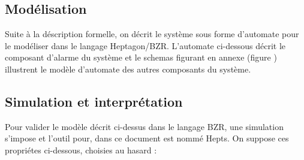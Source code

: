 \documentclass{svjour3}
\begin{document}
\subsection{Modélisation}
Suite à la déscription formelle, on décrit le système sous forme d'automate pour le modéliser dans le langage Heptagon/BZR. L'automate ci-dessous décrit le
composant d'alarme du système et le schemas figurant en annexe (figure ) illustrent le modèle d'automate des autres composants du système.
\subsection{Simulation et interprétation}
Pour valider le modèle décrit ci-dessus dans le langage BZR, une simulation s'impose et l'outil pour, dans ce document est nommé Hepts.
On suppose ces propriétes ci-dessous, choisies au hasard :
\end{document}
